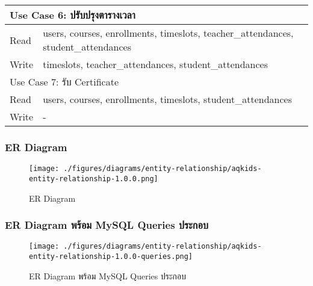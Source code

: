 \begin{table}[H]
\begin{tabularx}{\textwidth}{|ll|}
\multicolumn{2}{|l|}{Use Case 6: ปรับปรุงตารางเวลา}                                                              \\ \hline
\multicolumn{1}{|l|}{Read}  & users, courses, enrollments, timeslots, teacher\_attendances, student\_attendances \\ \hline
\multicolumn{1}{|l|}{Write} & timeslots, teacher\_attendances, student\_attendances                              \\ \hline
\multicolumn{2}{|l|}{Use Case 7: รับ Certificate}                                                                \\ \hline
\multicolumn{1}{|l|}{Read}  & users, courses, enrollments, timeslots, student\_attendances                       \\ \hline
\multicolumn{1}{|l|}{Write} & -                                                                                  \\ \hline
\end{tabularx}
\end{table}

\subsubsection{ER Diagram}

\begin{figure}[H]
\texttt{[image: ./figures/diagrams/entity-relationship/aqkids-entity-relationship-1.0.0.png]}
\caption{ER Diagram}
\label{fig:aqkids-entity-relationship}
\end{figure}


\subsubsection{ER Diagram พร้อม MySQL Queries ประกอบ}

\begin{figure}[H]
\texttt{[image: ./figures/diagrams/entity-relationship/aqkids-entity-relationship-1.0.0-queries.png]}
\caption{ER Diagram พร้อม MySQL Queries ประกอบ}
\label{fig:aqkids-entity-relationship-queries}
\end{figure}

